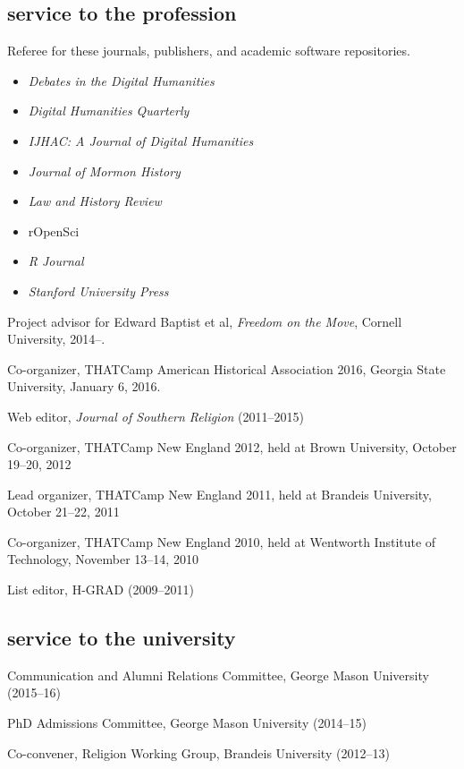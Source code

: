 \documentclass[11pt]{article}
\providecommand{\tightlist}{%
  \setlength{\itemsep}{0pt}\setlength{\parskip}{0pt}}
\begin{document}
\subsection{service to the profession}\label{service-profession}

Referee for these journals, publishers, and academic software repositories.

\vspace{-0.25in}
\begin{itemize}
    \tightlist
  \item \emph{Debates in the Digital Humanities}
  \item \emph{Digital Humanities Quarterly}
  \item \emph{IJHAC: A Journal of Digital Humanities}
  \item \emph{Journal of Mormon History}
  \item \emph{Law and History Review}
  \item rOpenSci
  \item \emph{R Journal}
  \item \emph{Stanford University Press}
\end{itemize}

Project advisor for Edward Baptist et al, \emph{Freedom on the Move}, Cornell 
University, 2014--.

Co-organizer, THATCamp American Historical Association 2016, Georgia State University, January 6, 2016.

Web editor, \emph{Journal of Southern Religion} (2011--2015)

Co-organizer, THATCamp New England 2012, held at Brown University,
October 19--20, 2012

Lead organizer, THATCamp New England 2011, held at Brandeis University,
October 21--22, 2011

Co-organizer, THATCamp New England 2010, held at Wentworth Institute of
Technology, November 13--14, 2010

List editor, H-GRAD (2009--2011)

\subsection{service to the university}\label{service-university}

Communication and Alumni Relations Committee, George Mason University 
(2015--16)

PhD Admissions Committee, George Mason University (2014--15)

Co-convener, Religion Working Group, Brandeis University (2012--13)
\end{document}

